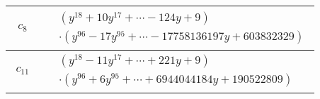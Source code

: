 \documentclass[1p]{elsarticle_modified}
\theoremstyle{definition}
\begin{document}
\begin{tabular}{m{50pt}|m{274pt}}
\hline $$\begin{aligned}c_{8}\end{aligned}$$&$\begin{aligned}
&(y^{18}+10 y^{17}+\cdots-124 y+9)\\
&\cdot(y^{96}-17 y^{95}+\cdots-17758136197 y+603832329)
\end{aligned}$\\
\hline $$\begin{aligned}c_{11}\end{aligned}$$&$\begin{aligned}
&(y^{18}-11 y^{17}+\cdots+221 y+9)\\
&\cdot(y^{96}+6 y^{95}+\cdots+6944044184 y+190522809)
\end{aligned}$\\
\hline
\end{tabular}
\vskip 2pc
\end{document}
